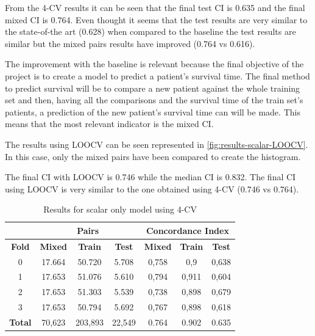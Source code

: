 From the 4-CV results it can be seen that the final test \gls{CI} is 0.635 and the final mixed 
\gls{CI} is 0.764. Even thought it seems that the test results are very similar to the
state-of-the art (0.628) when compared to the baseline the test results are similar but
the mixed pairs results have improved (0.764 vs 0.616).

The improvement with the baseline is relevant because the final objective of the project
is to create a model to predict a patient's survival time. The final method to predict
survival will be to compare a new patient against the whole training set and then, having
all the comparisons and the survival time of the train set's patients, a prediction of
the new patient's survival time can will be made. This means that the most relevant 
indicator is the mixed \gls{CI}.

The results using \gls{LOOCV} can be seen represented in \autoref{fig:results-scalar-LOOCV}. 
In this case, only the mixed pairs have been compared to create the histogram.

The final \gls{CI} with \gls{LOOCV} is 0.746 while the median \gls{CI} is 0.832. The final 
\gls{CI} using \gls{LOOCV} is very similar to the one obtained using 4-CV (0.746 vs 0.764).

\begin{table}
  \centering
  \begin{tabular}{|c||c|c|c||c|c|c|}
    \cline{2-7}
    \multicolumn{1}{c|}{} & \multicolumn{3}{|c||}{\textbf{Pairs}} & 
    \multicolumn{3}{c|}{\textbf{Concordance Index}} \\
    \hline
    \textbf{Fold} & \textbf{Mixed} & \textbf{Train} & \textbf{Test} & 
    \textbf{Mixed} & \textbf{Train} & \textbf{Test} \\
    \hhline{=======}
    0 & 17.664 & 50.720 & 5.708 & 0,758 & 0,9 & 0,638 \\
    1 & 17.653 & 51.076 & 5.610 & 0,794 & 0,911 & 0,604 \\
    2 & 17.653 & 51.303 & 5.539 & 0,738 & 0,898 & 0,679 \\
    3 & 17.653 & 50.794 & 5.692 & 0,767 & 0,898 & 0,618 \\
    \hhline{=======}
    \textbf{Total} & 70,623 & 203,893 & 22,549 & 0.764 & 0.902 & 0.635 \\
    \hline
  \end{tabular}

  \caption{Results for scalar only model using 4-CV \label{tab:results-scalar-4CV}}
\end{table}

